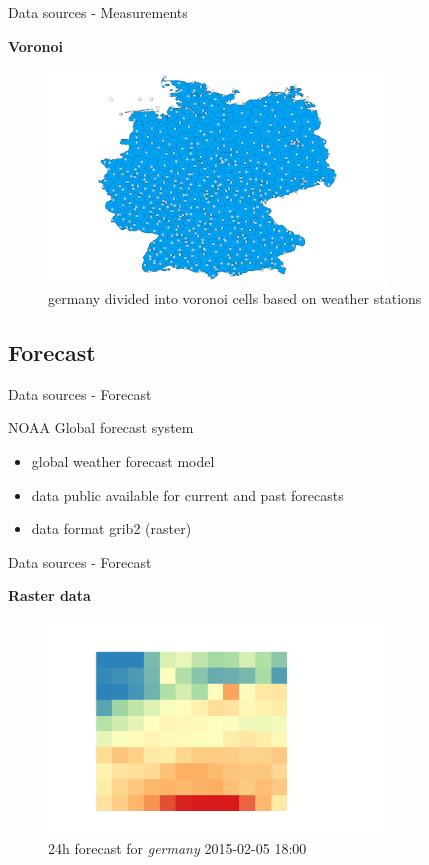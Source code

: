 \documentclass[ucs,9pt]{beamer}
\newcommand\headline[1]{%
  \par\bigskip
  {\Large\bfseries#1}\par\smallskip}
\begin{document}
\begin{frame}{Data sources - Measurements}
  \headline{Voronoi}
  \begin{figure}
    \centering
    \includegraphics[width=0.8\textwidth]{images/voronoi.png}
    \caption{germany divided into voronoi cells based on weather stations}
    \label{fig:voronoi}
  \end{figure}
\end{frame}

\subsection{Forecast}
\begin{frame}{Data sources - Forecast}
  \begin{block}{NOAA Global forecast system}
    \begin{itemize}
      \item global weather forecast model
      \item data public available for current and past forecasts
      \item data format grib2 (raster)
      \end{itemize}
  \end{block}
\end{frame}

\begin{frame}{Data sources - Forecast}
  \headline{Raster data}
  \begin{figure}
    \centering
    \includegraphics[width=0.8\textwidth]{images/raster.png}
    \caption{24h forecast for \textit{germany} 2015-02-05 18:00}
    \label{fig:voronoi}
  \end{figure}
\end{frame}
\end{document}
